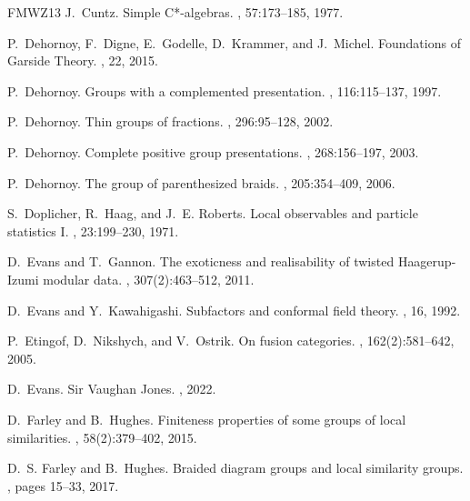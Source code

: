 \documentclass[a4paper, 12pt]{amsart}
\numberwithin{equation}{section}
\theoremstyle{definition}
\begin{document}
\begin{thebibliography}{FMWZ13}
J.~Cuntz.
\newblock Simple {C*}-algebras.
, 57:173--185, 1977.

P.~Dehornoy, F.~Digne, E.~Godelle, D.~Krammer, and J.~Michel.
\newblock Foundations of {G}arside {T}heory.
, 22, 2015.

P.~Dehornoy.
\newblock Groups with a complemented presentation.
, 116:115--137, 1997.

P.~Dehornoy.
\newblock Thin groups of fractions.
, 296:95--128, 2002.

P.~Dehornoy.
\newblock Complete positive group presentations.
, 268:156--197, 2003.

P.~Dehornoy.
\newblock The group of parenthesized braids.
, 205:354--409, 2006.

S.~Doplicher, R.~Haag, and J.~E. Roberts.
\newblock Local observables and particle statistics {I}.
, 23:199--230, 1971.

D.~Evans and T.~Gannon.
\newblock The exoticness and realisability of twisted {H}aagerup-{I}zumi
  modular data.
, 307(2):463--512, 2011.

D.~Evans and Y.~Kawahigashi.
\newblock Subfactors and conformal field theory.
, 16, 1992.

P.~Etingof, D.~Nikshych, and V.~Ostrik.
\newblock On fusion categories.
, 162(2):581--642, 2005.

D.~Evans.
\newblock Sir {V}aughan {J}ones.
, 2022.

D.~Farley and B.~Hughes.
\newblock Finiteness properties of some groups of local similarities.
,
  58(2):379--402, 2015.

D.~S. Farley and B.~Hughes.
\newblock Braided diagram groups and local similarity groups.
, pages 15--33,
  2017.
  

\end{thebibliography}
\end{document}
